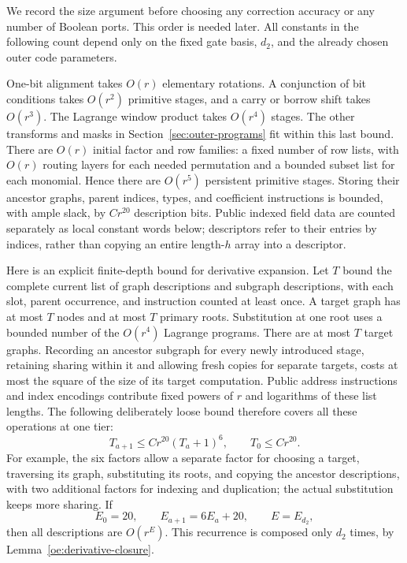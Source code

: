 We record the size argument before choosing any correction accuracy or
any number of Boolean ports. This order is needed later. All constants
in the following count depend only on the fixed gate basis, $d_2$, and
the already chosen outer code parameters.

One-bit alignment takes $O(r)$ elementary rotations. A conjunction of
bit conditions takes $O(r^2)$ primitive stages, and a carry or borrow
shift takes $O(r^3)$. The Lagrange window product takes $O(r^4)$ stages.
The other transforms and masks in Section~\ref{sec:outer-programs} fit
within this last bound. There are $O(r)$ initial factor and row families:
a fixed number of row lists, with $O(r)$ routing layers for each needed
permutation and a bounded subset list for each monomial. Hence there are
$O(r^5)$ persistent primitive stages. Storing their ancestor graphs,
parent indices, types, and coefficient instructions is bounded, with
ample slack, by $Cr^{20}$ description bits. Public indexed field data
are counted separately as local constant words below; descriptors refer
to their entries by indices, rather than copying an entire length-$h$
array into a descriptor.

Here is an explicit finite-depth bound for derivative expansion. Let $T$
bound the complete current list of graph descriptions and subgraph
descriptions, with each slot, parent occurrence, and instruction counted
at least once. A target graph has at most $T$ nodes and at most $T$
primary roots. Substitution at one root uses a bounded number of the
$O(r^4)$ Lagrange programs. There are at most $T$ target graphs. Recording
an ancestor subgraph for every newly introduced stage, retaining sharing
within it and allowing fresh copies for separate targets, costs at most
the square of the size of its target computation. Public address
instructions and index encodings contribute fixed powers of $r$ and
logarithms of these list lengths. The following deliberately loose bound
therefore covers all these operations at one tier:
\begin{equation}\label{oe:recipe-size-recurrence}
 T_{a+1}\leq C r^{20}(T_a+1)^6,\qquad T_0\leq Cr^{20}.
\end{equation}
For example, the six factors allow a separate factor for choosing a
target, traversing its graph, substituting its roots, and copying the
ancestor descriptions, with two additional factors for indexing and
duplication; the actual substitution keeps more sharing. If
\begin{equation}\label{oe:recipe-exponent}
 E_0=20,\qquad E_{a+1}=6E_a+20,\qquad E=E_{d_2},
\end{equation}
then all descriptions are $O(r^E)$. This recurrence is composed only
$d_2$ times, by Lemma~\ref{oe:derivative-closure}.

